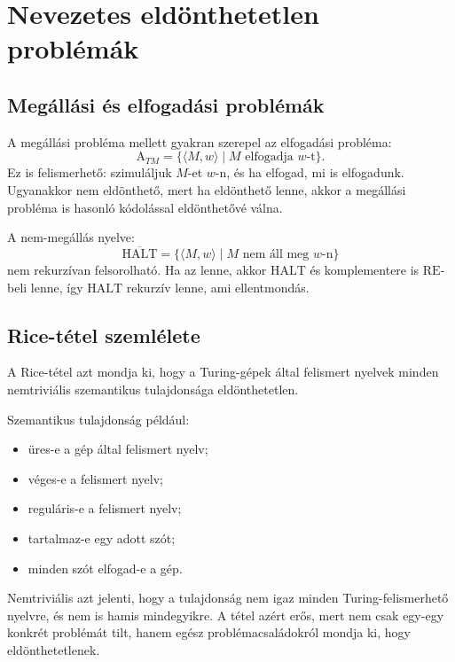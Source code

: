 \section{Nevezetes eldönthetetlen problémák}

\subsection{Megállási és elfogadási problémák}

A megállási probléma mellett gyakran szerepel az elfogadási probléma:
\[
  \mathrm{A}_{TM}=\{\langle M,w\rangle\mid M \text{ elfogadja } w\text{-t}\}.
\]
Ez is felismerhető: szimuláljuk $M$-et $w$-n, és ha elfogad, mi is elfogadunk. Ugyanakkor nem eldönthető, mert ha eldönthető lenne, akkor a megállási probléma is hasonló kódolással eldönthetővé válna.

A nem-megállás nyelve:
\[
  \overline{\mathrm{HALT}}=
  \{\langle M,w\rangle\mid M \text{ nem áll meg } w\text{-n}\}
\]
nem rekurzívan felsorolható. Ha az lenne, akkor $\mathrm{HALT}$ és komplementere is $\mathrm{RE}$-beli lenne, így $\mathrm{HALT}$ rekurzív lenne, ami ellentmondás.

\begin{center}

\end{center}

\subsection{Rice-tétel szemlélete}

A Rice-tétel azt mondja ki, hogy a Turing-gépek által felismert nyelvek minden nemtriviális szemantikus tulajdonsága eldönthetetlen.

Szemantikus tulajdonság például:

\begin{itemize}
  \item üres-e a gép által felismert nyelv;
  \item véges-e a felismert nyelv;
  \item reguláris-e a felismert nyelv;
  \item tartalmaz-e egy adott szót;
  \item minden szót elfogad-e a gép.
\end{itemize}

Nemtriviális azt jelenti, hogy a tulajdonság nem igaz minden Turing-felismerhető nyelvre, és nem is hamis mindegyikre. A tétel azért erős, mert nem csak egy-egy konkrét problémát tilt, hanem egész problémacsaládokról mondja ki, hogy eldönthetetlenek.


